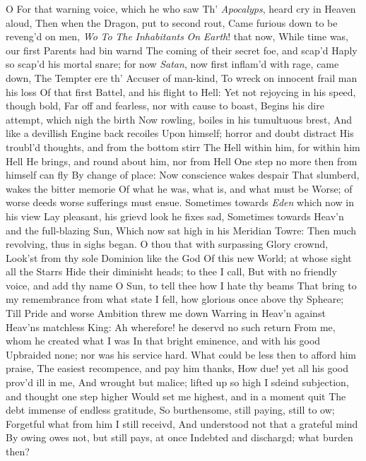 \documentclass[11pt]{book}
\newcounter {first}
\begin{document}
O For that warning voice, which he who saw 
Th' \textit{Apocalyps}, heard cry in Heaven aloud, 
Then when the Dragon, put to second rout, 
Came furious down to be reveng'd on men, 
\textit{Wo} \textit{To} \textit{The} \textit{Inhabitants} \textit{On} \textit{Earth}! that now, 
While time was, our first Parents had bin warnd 
The coming of their secret foe, and scap'd 
Haply so scap'd his mortal snare; for now 
\textit{Satan}, now first inflam'd with rage, came down, 
The Tempter ere th' Accuser of man-kind, 
To wreck on innocent frail man his loss 
Of that first Battel, and his flight to Hell: 
Yet not rejoycing in his speed, though bold, 
Far off and fearless, nor with cause to boast, 
Begins his dire attempt, which nigh the birth 
Now rowling, boiles in his tumultuous brest, 
And like a devillish Engine back recoiles 
Upon himself; horror and doubt distract 
His troubl'd thoughts, and from the bottom stirr 
The Hell within him, for within him Hell 
He brings, and round about him, nor from Hell 
One step no more then from himself can fly 
By change of place: Now conscience wakes despair 
That slumberd, wakes the bitter memorie 
Of what he was, what is, and what must be 
Worse; of worse deeds worse sufferings must ensue. 
Sometimes towards \textit{Eden} which now in his view 
Lay pleasant, his grievd look he fixes sad, 
Sometimes towards Heav'n and the full-blazing Sun, 
Which now sat high in his Meridian Towre: 
Then much revolving, thus in sighs began. 
\quad O thou that with surpassing Glory crownd, 
Look'st from thy sole Dominion like the God 
Of this new World; at whose sight all the Starrs 
Hide their diminisht heads; to thee I call, 
But with no friendly voice, and add thy name 
O Sun, to tell thee how I hate thy beams 
That bring to my remembrance from what state 
I fell, how glorious once above thy Spheare; 
Till Pride and worse Ambition threw me down 
Warring in Heav'n against Heav'ns matchless King: 
Ah wherefore! he deservd no such return 
From me, whom he created what I was 
In that bright eminence, and with his good 
Upbraided none; nor was his service hard. 
What could be less then to afford him praise, 
The easiest recompence, and pay him thanks, 
How due! yet all his good prov'd ill in me, 
And wrought but malice; lifted up so high 
I sdeind subjection, and thought one step higher 
Would set me highest, and in a moment quit 
The debt immense of endless gratitude, 
So burthensome, still paying, still to ow; 
Forgetful what from him I still receivd, 
And understood not that a grateful mind 
By owing owes not, but still pays, at once 
Indebted and dischargd; what burden then? 
\end{document}
